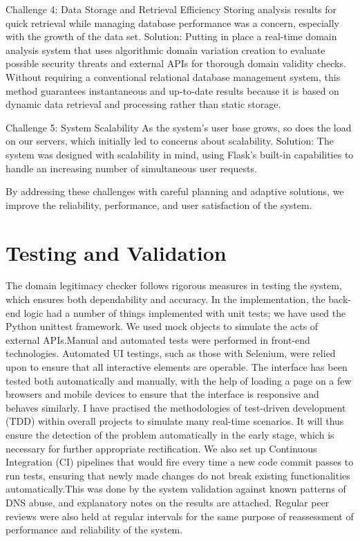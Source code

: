 Challenge 4: Data Storage and Retrieval Efficiency
Storing analysis results for quick retrieval while managing database performance was a concern, especially with the growth of the data set.
Solution: Putting in place a real-time domain analysis system that uses algorithmic domain variation creation to evaluate possible security threats and external APIs for thorough domain validity checks. Without requiring a conventional relational database management system, this method guarantees instantaneous and up-to-date results because it is based on dynamic data retrieval and processing rather than static storage. 

Challenge 5: System Scalability
As the system's user base grows, so does the load on our servers, which initially led to concerns about scalability.
Solution: The system was designed with scalability in mind, using Flask's built-in capabilities to handle an increasing number of simultaneous user requests. 

By addressing these challenges with careful planning and adaptive solutions, we improve the reliability, performance, and user satisfaction of the system.

\section{Testing and Validation}

The domain legitimacy checker follows rigorous measures in testing the system, which ensures both dependability and accuracy. In the implementation, the back-end logic had a number of things implemented with unit tests; we have used the Python unittest framework. We used mock objects to simulate the acts of external APIs.Manual and automated tests were performed in front-end technologies. Automated UI testings, such as those with Selenium, were relied upon to ensure that all interactive elements are operable. The interface has been tested both automatically and manually, with the help of loading a page on a few browsers and mobile devices to ensure that the interface is responsive and behaves similarly. I have practised the methodologies of test-driven development (TDD) within overall projects to simulate many real-time scenarios. It will thus ensure the detection of the problem automatically in the early stage, which is necessary for further appropriate rectification. We also set up Continuous Integration (CI) pipelines that would fire every time a new code commit passes to run tests, ensuring that newly made changes do not break existing functionalities automatically.This was done by the system validation against known patterns of DNS abuse, and explanatory notes on the results are attached. Regular peer reviews were also held at regular intervals for the same purpose of reassessment of performance and reliability of the system.


